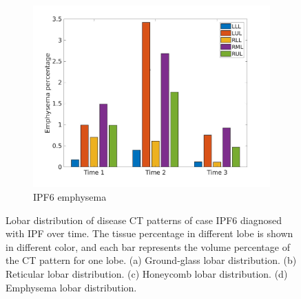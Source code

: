 \begin{figure}[H]
\begin{subfigure}{.46\linewidth}
  \includegraphics[width=\linewidth,trim={{.0\wd0} {.0\wd0} {.0\wd0} {.0\wd0}},clip]{Appendix/Image_AppexA/LobarDistribution/IPF6EmphysemaLobarRegionDiseaseDistributionOverTime.jpg}
  \caption{IPF6 emphysema}
  \label{fig:IPF6LobarRegionDiseaseDistributionOverTime-d}
\end{subfigure}
\caption{Lobar distribution of disease CT patterns of case IPF6 diagnosed with IPF over time. The tissue percentage in different lobe is shown in different color, and each bar represents the volume percentage of the CT pattern for one lobe. (a) Ground-glass lobar distribution. (b) Reticular lobar distribution. (c) Honeycomb lobar distribution. (d) Emphysema lobar distribution.}
\label{fig:IPF6LobarRegionDiseaseDistributionOverTime}
\end{figure}

